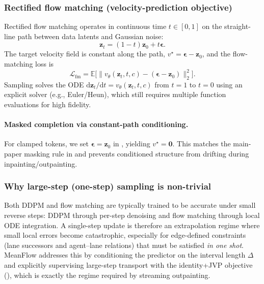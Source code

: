 \documentclass{article}
\theoremstyle{plain}
\theoremstyle{definition}
\theoremstyle{remark}
\begin{document}
\subsubsection{Rectified flow matching (velocity-prediction objective)}
Rectified flow matching operates in continuous time \(t\in[0,1]\) on the straight-line path between data latents and Gaussian noise:
\begin{equation}
\label{eq:app:rf_path}
\mathbf{z}_t = (1-t)\mathbf{z}_0 + t\boldsymbol{\epsilon}.
\end{equation}
The target velocity field is constant along the path, \(v^{\star}=\boldsymbol{\epsilon}-\mathbf{z}_0\), and the flow-matching loss is
\begin{equation}
\label{eq:app:rf_loss}
\mathcal{L}_{\mathrm{fm}}
=
\mathbb{E}\Big[\big\lVert v_{\theta}(\mathbf{z}_t,t,c)-(\boldsymbol{\epsilon}-\mathbf{z}_0)\big\rVert_2^2\Big].
\end{equation}
Sampling solves the ODE \(\mathrm{d}\mathbf{z}_t/\mathrm{d}t = v_{\theta}(\mathbf{z}_t,t,c)\) from \(t=1\) to \(t=0\) using an explicit solver (e.g., Euler/Heun), which still requires multiple function evaluations for high fidelity.

\paragraph{Masked completion via constant-path conditioning.}
For clamped tokens, we set \(\boldsymbol{\epsilon}=\mathbf{z}_0\) in , yielding \(v^{\star}=\mathbf{0}\).
This matches the main-paper masking rule in  and prevents conditioned structure from drifting during inpainting/outpainting.

\subsubsection{Why large-step (one-step) sampling is non-trivial}
Both DDPM and flow matching are typically trained to be accurate under small reverse steps: DDPM through per-step denoising and flow matching through local ODE integration.
A single-step update is therefore an extrapolation regime where small local errors become catastrophic, especially for edge-defined constraints (lane successors and agent--lane relations) that must be satisfied \emph{in one shot}.
MeanFlow addresses this by conditioning the predictor on the interval length \(\Delta\) and explicitly supervising large-step transport with the identity+JVP objective (), which is exactly the regime required by streaming outpainting.
\end{document}
